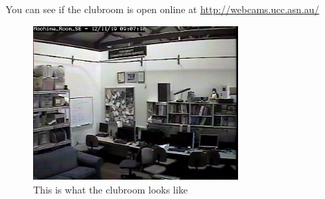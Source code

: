 You can see if the clubroom is open online at \url{http://webcams.ucc.asn.au/}

\begin{figure}[H]
	\centering
	\includegraphics[width=0.7\textwidth]{figures/webcam2.jpg}
	\caption{This is what the clubroom looks like}
	\label{webcam2.jpg}
\end{figure}


